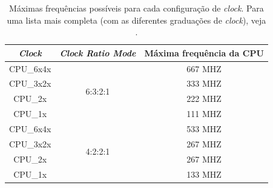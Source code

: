 \begin{table}[ht]
	\centering
	\begin{tabular}{ccc}
		\hline\hline
		\emph{Clock} & \emph{Clock Ratio Mode} & Máxima frequência da CPU\\[0.5ex]
		\hline
		CPU\_6x4x & \multirow{4}{*}{6:3:2:1} & 667 MHZ\\
		CPU\_3x2x &                          & 333 MHZ\\
		CPU\_2x   &                          & 222 MHZ\\
		CPU\_1x   &                          & 111 MHZ\\
		\hline
		CPU\_6x4x & \multirow{4}{*}{4:2:2:1} & 533 MHZ\\
		CPU\_3x2x &                          & 267 MHZ\\
		CPU\_2x   &                          & 267 MHZ\\
		CPU\_1x   &                          & 133 MHZ\\[1ex]
		\hline
	\end{tabular}
	\caption{Máximas frequências possíveis para cada configuração de \emph{clock}. Para uma lista mais completa (com as diferentes graduações de \emph{clock}), veja \cite[p.~13]{data_sheet}.}
	\label{tab:clocks}
\end{table}






